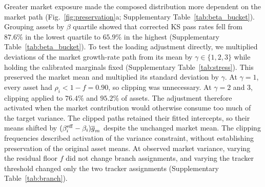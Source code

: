 Greater market exposure made the composed distribution more dependent
on the market path (Fig.~\ref{fig:preservation}a;
Supplementary Table~\ref{tab:beta_bucket}). Grouping assets by $\beta$ quartile showed that
corrected KS pass rates fell from $87.6\%$ in the lowest quartile
to $65.9\%$ in the highest (Supplementary Table~\ref{tab:beta_bucket}).
To test the loading adjustment directly, we multiplied deviations of
the market growth-rate path from its mean by
$\gamma\in\{1,2,3\}$ while holding the calibrated marginals fixed
(Supplementary Table~\ref{tab:stress}). This preserved the market mean and multiplied
its standard deviation by $\gamma$. At $\gamma=1$, every
asset had $\rho_i<1-f=0.90$, so clipping was unnecessary.
At $\gamma=2$ and $3$, clipping applied to $76.4\%$ and $95.2\%$
of assets. The adjustment therefore activated when the market
contribution would otherwise consume too much of the target variance.
The clipped paths retained their fitted intercepts, so their means
shifted by $(\beta_i^{\mathrm{eff}}-\beta_i)\overline{g}_m$ despite the
unchanged market mean. The clipping frequencies described activation
of the variance constraint, without establishing preservation of the
original asset means. At observed market variance, varying the residual floor
$f$ did not change branch assignments, and varying the tracker
threshold changed only the two tracker assignments
(Supplementary Table~\ref{tab:branch}).
